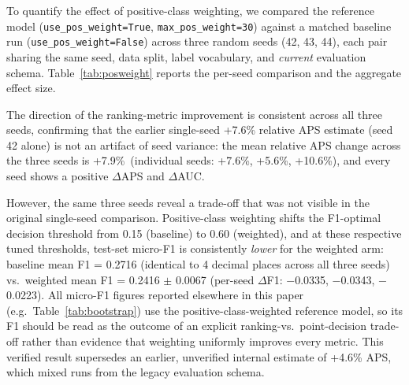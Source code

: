 \documentclass[11pt]{article}
\begin{document}
To quantify the effect of positive-class weighting, we compared the reference
model (\texttt{use\_pos\_weight=True}, \texttt{max\_pos\_weight=30}) against
a matched baseline run (\texttt{use\_pos\_weight=False}) across three random
seeds (42, 43, 44), each pair sharing the same seed, data split, label
vocabulary, and \emph{current} evaluation schema. Table~\ref{tab:posweight}
reports the per-seed comparison and the aggregate effect size.

\begin{table}[h]
\centering
\caption{Multi-seed effect of positive-class weighting (3 seeds, matched
data/schema).}
\label{tab:posweight}
\end{table}

The direction of the ranking-metric improvement is consistent across all
three seeds, confirming that the earlier single-seed +7.6\% relative APS
estimate (seed 42 alone) is not an artifact of seed variance: the mean
relative APS change across the three seeds is +7.9\%\ (individual seeds:
+7.6\%, +5.6\%, +10.6\%), and every seed shows a positive $\Delta$APS and
$\Delta$AUC.

However, the same three seeds reveal a trade-off that was not visible in
the original single-seed comparison. Positive-class weighting shifts the
F1-optimal decision threshold from 0.15 (baseline) to 0.60 (weighted), and
at these respective tuned thresholds, test-set micro-F1 is consistently
\emph{lower} for the weighted arm: baseline mean F1 = 0.2716 (identical to
4 decimal places across all three seeds) vs.\ weighted mean F1 = 0.2416
$\pm$ 0.0067 (per-seed $\Delta$F1: $-$0.0335, $-$0.0343, $-$0.0223). All
micro-F1 figures reported elsewhere in this paper (e.g.\
Table~\ref{tab:bootstrap}) use the positive-class-weighted reference
model, so its F1 should be read as the outcome of an explicit
ranking-vs.\ point-decision trade-off rather than evidence that weighting
uniformly improves every metric. This verified result supersedes an
earlier, unverified internal estimate of +4.6\% APS, which mixed runs from
the legacy evaluation schema.
\end{document}
